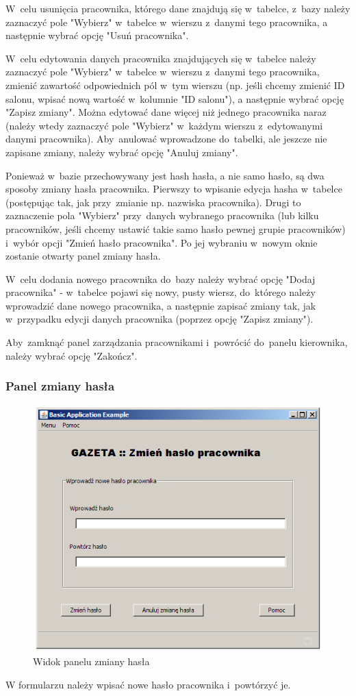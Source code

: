 W~celu usunięcia pracownika, którego dane znajdują się w~tabelce, z~bazy należy zaznaczyć pole "Wybierz" w~tabelce w~wierszu z~danymi tego pracownika, a następnie wybrać opcję "Usuń pracownika".

W~celu edytowania danych pracownika znajdujących się w~tabelce należy zaznaczyć pole "Wybierz" w~tabelce w~wierszu z~danymi tego pracownika, zmienić zawartość odpowiednich pól w~tym wierszu (np. jeśli chcemy zmienić ID salonu, wpisać nową wartość w~kolumnie "ID salonu"), a następnie wybrać opcję "Zapisz zmiany". Można edytować dane więcej niż jednego pracownika naraz (należy wtedy zaznaczyć pole "Wybierz" w~każdym wierszu z~edytowanymi danymi pracownika). Aby~anulować wprowadzone do~tabelki, ale jeszcze nie zapisane zmiany, należy wybrać opcję "Anuluj zmiany".

Ponieważ w~bazie przechowywany jest hash hasła, a nie samo hasło, są dwa sposoby zmiany hasła pracownika. Pierwszy to wpisanie edycja hasha w~tabelce (postępując tak, jak przy~zmianie np. nazwiska pracownika). Drugi to zaznaczenie pola "Wybierz" przy~danych wybranego pracownika (lub kilku pracowników, jeśli chcemy ustawić takie samo hasło pewnej grupie pracowników) i~wybór opcji "Zmień hasło pracownika". Po jej wybraniu w~nowym oknie zostanie otwarty panel zmiany hasła.

W~celu dodania nowego pracownika do~bazy należy wybrać opcję "Dodaj pracownika" - w~tabelce pojawi się nowy, pusty wiersz, do~którego należy wprowadzić dane nowego pracownika, a następnie zapisać zmiany tak, jak w~przypadku edycji danych pracownika (poprzez opcję "Zapisz zmiany").

Aby~zamknąć panel zarządzania pracownikami i~powrócić do~panelu kierownika, należy wybrać opcję "Zakończ".
\subsubsection{Panel zmiany hasła}
\begin{figure}
\includegraphics[width=1\textwidth]{gfx/zmiana_hasla.png}
\caption{Widok panelu zmiany hasła}
\end{figure}
W formularzu należy wpisać nowe hasło pracownika i~powtórzyć je.

